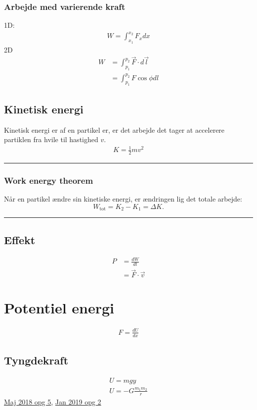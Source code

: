 \documentclass[a4paper,oneside,article]{memoir}
\begin{document}
\subsubsection{Arbejde med varierende kraft}
1D:
\begin{align*}
    W = \int_{x_1}^{x_2}F_xdx
\end{align*}
2D
\begin{align*}
    W &= \int_{p_1}^{p_2}\Vec{F}\cdot d\Vec{l} \\
    &= \int_{p_1}^{p_2}F\cos{\phi} dl
\end{align*}

\subsection{Kinetisk energi} \label{scc:kinetiskenergi}
Kinetisk energi er af en partikel er, er det arbejde det tager at accelerere partiklen fra hvile til hastighed $v$. 
\begin{align*}
    K = \frac{1}{2} mv^2
\end{align*}
\plainbreak{1}

\subsubsection{Work energy theorem} \label{workenergy}
Når en partikel ændre sin kinetiske energi, er ændringen lig det totale arbejde: \[W_\text{tot}=K_2-K_1=\Delta K.\]
\plainbreak{1}

\subsection{Effekt} \label{krafteffekt}
\begin{align*}
    P &= \frac{dW}{dt} \\
    &= \Vec{F}\cdot \Vec{v}
\end{align*}

\newpage
\section{Potentiel energi} \label{potentielenergi}
\begin{align*}
    F = \frac{dU}{dx}
\end{align*}
\subsection{Tyngdekraft}
\begin{align*}
    U = mgy \\
    U = -G\frac{m_1m_2}{r}
\end{align*}
\hyperref[asc:Maj 2018 opg 5]{Maj 2018 opg 5}, \hyperref[asc:Jan 2019 opg 2]{Jan 2019 opg 2}
\end{document}
